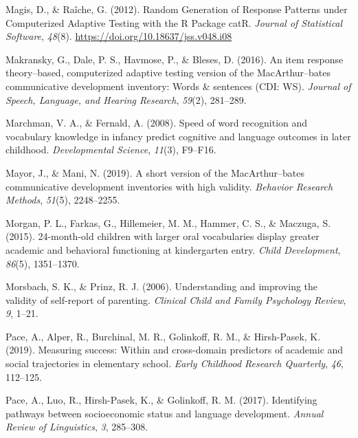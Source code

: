 \documentclass[
  man,floatsintext]{apa6}
\newlength{\cslhangindent}
\newlength{\cslentryspacingunit} %
\newenvironment{CSLReferences}[2] %
 {%
  \setlength{\parindent}{0pt}
  \ifodd #1
  \let\oldpar\par
  \def\par{\hangindent=\cslhangindent\oldpar}
  \fi
  \setlength{\parskip}{#2\cslentryspacingunit}
 }%
 {}
\begin{document}
\begin{CSLReferences}{1}{0}
\leavevmode{}%
Magis, D., \& Raîche, G. (2012). Random Generation of Response Patterns under Computerized Adaptive Testing with the R Package catR. \emph{Journal of Statistical Software}, \emph{48}(8). \url{https://doi.org/10.18637/jss.v048.i08}

\leavevmode{}%
Makransky, G., Dale, P. S., Havmose, P., \& Bleses, D. (2016). An item response theory--based, computerized adaptive testing version of the MacArthur--bates communicative development inventory: Words \& sentences (CDI: WS). \emph{Journal of Speech, Language, and Hearing Research}, \emph{59}(2), 281--289.

\leavevmode{}%
Marchman, V. A., \& Fernald, A. (2008). Speed of word recognition and vocabulary knowledge in infancy predict cognitive and language outcomes in later childhood. \emph{Developmental Science}, \emph{11}(3), F9--F16.

\leavevmode{}%
Mayor, J., \& Mani, N. (2019). A short version of the MacArthur--bates communicative development inventories with high validity. \emph{Behavior Research Methods}, \emph{51}(5), 2248--2255.

\leavevmode{}%
Morgan, P. L., Farkas, G., Hillemeier, M. M., Hammer, C. S., \& Maczuga, S. (2015). 24-month-old children with larger oral vocabularies display greater academic and behavioral functioning at kindergarten entry. \emph{Child Development}, \emph{86}(5), 1351--1370.

\leavevmode{}%
Morsbach, S. K., \& Prinz, R. J. (2006). Understanding and improving the validity of self-report of parenting. \emph{Clinical Child and Family Psychology Review}, \emph{9}, 1--21.

\leavevmode{}%
Pace, A., Alper, R., Burchinal, M. R., Golinkoff, R. M., \& Hirsh-Pasek, K. (2019). Measuring success: Within and cross-domain predictors of academic and social trajectories in elementary school. \emph{Early Childhood Research Quarterly}, \emph{46}, 112--125.

\leavevmode{}%
Pace, A., Luo, R., Hirsh-Pasek, K., \& Golinkoff, R. M. (2017). Identifying pathways between socioeconomic status and language development. \emph{Annual Review of Linguistics}, \emph{3}, 285--308.


\end{CSLReferences}
\end{document}

